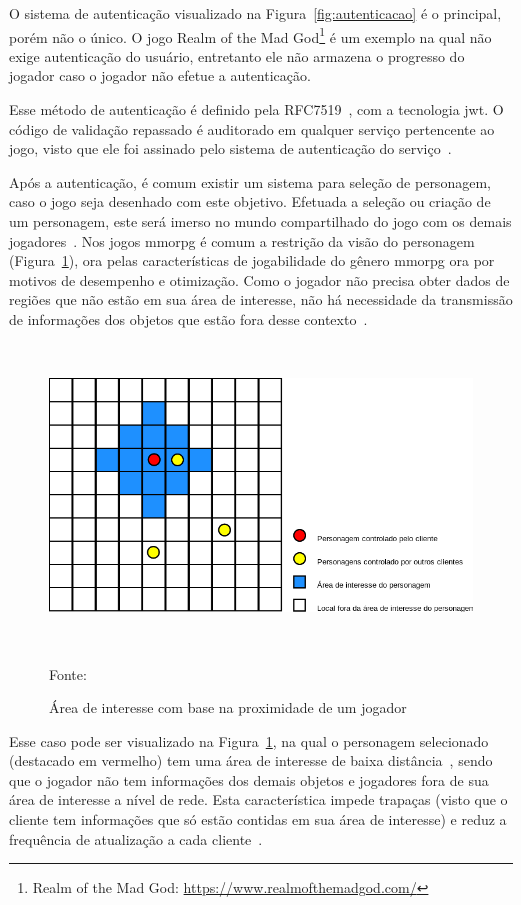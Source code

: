 O sistema de autenticação visualizado na Figura~\ref{fig:autenticacao} é o principal, porém não o único.
%
O jogo Realm of the Mad God\footnote{Realm of the Mad God: \url{https://www.realmofthemadgod.com/}} é um exemplo na qual não exige autenticação do usuário, entretanto ele não armazena o progresso do jogador caso o jogador não efetue a autenticação.


Esse método de autenticação é definido pela RFC7519~\cite{rfc7519}, com a tecnologia \ac{jwt}.
%
O código de validação repassado é auditorado em qualquer serviço pertencente ao jogo, visto que ele foi assinado pelo sistema de autenticação do serviço~\cite{Ikem2018May}.


Após a autenticação, é comum existir um sistema para seleção de personagem, caso o jogo seja desenhado com este objetivo.
%
Efetuada a seleção ou criação de um personagem, este será imerso no mundo compartilhado do jogo com os demais jogadores~\cite{matthiasrudy2011}.
%
Nos jogos \ac{mmorpg} é comum a restrição da visão do personagem (Figura~\ref{fig:proximidade}), ora pelas características de jogabilidade do gênero \ac{mmorpg} ora por motivos de desempenho e otimização.
%
Como o jogador não precisa obter dados de regiões que não estão em sua área de interesse, não há necessidade da transmissão de informações dos objetos que estão fora desse contexto~\cite{albion_online_unite}.

\begin{figure}[htb!]
\caption{Área de interesse com base na proximidade de um jogador}
\label{fig:proximidade}
\includegraphics[height=8cm]{img/cap2/proximidade.png}
\centering

Fonte:~\cite{albion_online_unite}
\end{figure}


Esse caso pode ser visualizado na Figura~\ref{fig:proximidade}, na qual o personagem selecionado (destacado em vermelho) tem uma área de interesse de baixa distância~\cite{albion_online_unite}, sendo que o jogador não tem informações dos demais objetos e jogadores fora de sua área de interesse a nível de rede.
%
Esta característica impede trapaças (visto que o cliente tem informações que só estão contidas em sua área de interesse) e reduz a frequência de atualização a cada cliente~\cite{albion_online_unite}.


